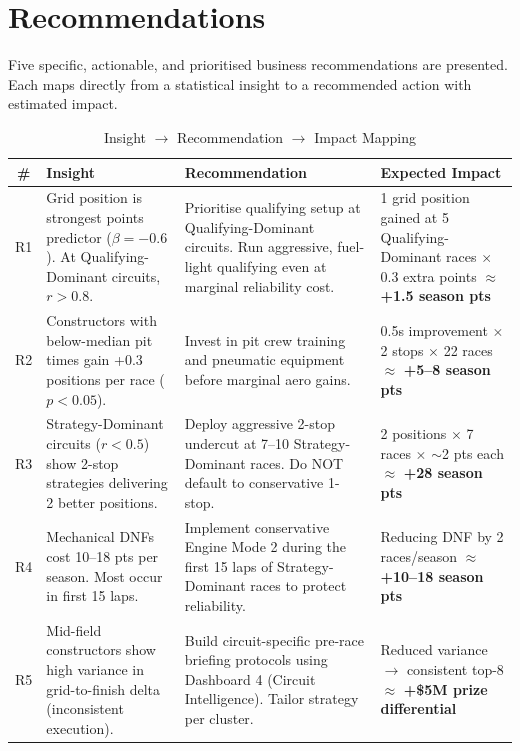 \documentclass[12pt, a4paper]{article}
\begin{document}
\newpage

\section{Recommendations}

Five specific, actionable, and prioritised business recommendations are presented. Each maps directly from a statistical insight to a recommended action with estimated impact.

\begin{table}[H]
\centering
\caption{Insight $\rightarrow$ Recommendation $\rightarrow$ Impact Mapping}
\small
\begin{tabularx}{\textwidth}{c X X X}
\toprule
\textbf{\#} & \textbf{Insight} & \textbf{Recommendation} & \textbf{Expected Impact} \\
\midrule
R1 & Grid position is strongest points predictor ($\beta = -0.6$). At Qualifying-Dominant circuits, $r > 0.8$. & Prioritise qualifying setup at Qualifying-Dominant circuits. Run aggressive, fuel-light qualifying even at marginal reliability cost. & 1 grid position gained at 5 Qualifying-Dominant races $\times$ 0.3 extra points $\approx$ \textbf{+1.5 season pts} \\[6pt]
R2 & Constructors with below-median pit times gain +0.3 positions per race ($p < 0.05$). & Invest in pit crew training and pneumatic equipment before marginal aero gains. & 0.5s improvement $\times$ 2 stops $\times$ 22 races $\approx$ \textbf{+5--8 season pts} \\[6pt]
R3 & Strategy-Dominant circuits ($r < 0.5$) show 2-stop strategies delivering 2 better positions. & Deploy aggressive 2-stop undercut at 7--10 Strategy-Dominant races. Do NOT default to conservative 1-stop. & 2 positions $\times$ 7 races $\times$ $\sim$2 pts each $\approx$ \textbf{+28 season pts} \\[6pt]
R4 & Mechanical DNFs cost 10--18 pts per season. Most occur in first 15 laps. & Implement conservative Engine Mode 2 during the first 15 laps of Strategy-Dominant races to protect reliability. & Reducing DNF by 2 races/season $\approx$ \textbf{+10--18 season pts} \\[6pt]
R5 & Mid-field constructors show high variance in grid-to-finish delta (inconsistent execution). & Build circuit-specific pre-race briefing protocols using Dashboard 4 (Circuit Intelligence). Tailor strategy per cluster. & Reduced variance $\rightarrow$ consistent top-8 $\approx$ \textbf{+\$5M prize differential} \\
\bottomrule
\end{tabularx}
\end{table}
\end{document}
